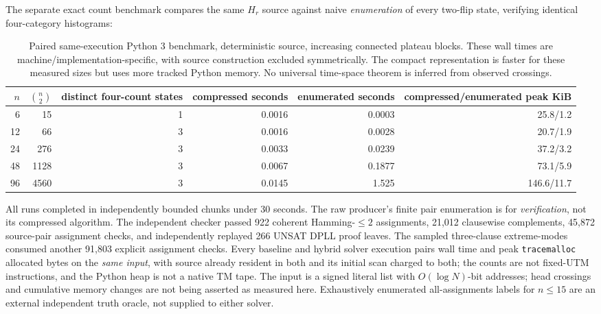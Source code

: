 \documentclass[10pt]{article}
\begin{document}
The separate exact count benchmark compares the same $H_r$ source against naive \emph{enumeration} of every two-flip state, verifying identical four-category histograms:
\begin{table}[ht]\centering\small
\begin{tabular}{rrrrrr}
\toprule
$n$ & $\binom n2$ & distinct four-count states & compressed seconds & enumerated seconds & compressed/enumerated peak KiB\\
\midrule
6&15&1&0.0016&0.0003&25.8/1.2\\
12&66&3&0.0016&0.0028&20.7/1.9\\
24&276&3&0.0033&0.0239&37.2/3.2\\
48&1128&3&0.0067&0.1877&73.1/5.9\\
96&4560&3&0.0145&1.525&146.6/11.7\\
\bottomrule
\end{tabular}
\caption{Paired same-execution Python 3 benchmark, deterministic source, increasing connected plateau blocks. These wall times are machine/implementation-specific, with source construction excluded symmetrically. The compact representation is faster for these measured sizes but uses more tracked Python memory. No universal time-space theorem is inferred from observed crossings.}
\end{table}

All runs completed in independently bounded chunks under 30 seconds. The raw producer's finite pair enumeration is for \emph{verification}, not its compressed algorithm. The independent checker passed 922 coherent Hamming-$\le2$ assignments, 21,012 clausewise complements, 45,872 source-pair assignment checks, and independently replayed 266 UNSAT DPLL proof leaves. The sampled three-clause extreme-modes consumed another 91,803 explicit assignment checks. Every baseline and hybrid solver execution pairs wall time and peak \texttt{tracemalloc} allocated bytes on the \emph{same input}, with source already resident in both and its initial scan charged to both; the counts are not fixed-UTM instructions, and the Python heap is not a native TM tape. The input is a signed literal list with $O(\log N)$-bit addresses; head crossings and cumulative memory changes are not being asserted as measured here. Exhaustively enumerated all-assignments labels for $n\le15$ are an external independent truth oracle, not supplied to either solver.
\end{document}
